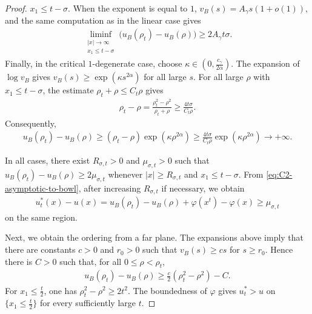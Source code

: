 \documentclass[10pt,a4paper]{amsart}
\begin{document}
\begin{proof}
		$x_1\le t-\sigma$.  When the exponent is equal to $1$,
		$v_B(s)=A_\gamma s(1+o(1))$, and the same computation as in the linear case
		gives
		\begin{align*}
			\liminf\limits_{\substack{|x|\to\infty\\ x_1\le t-\sigma}}
			\bigl(u_B(\rho_t)-u_B(\rho)\bigr)
			\ge
			2A_\gamma t\sigma .
		\end{align*}
		Finally, in the critical $1$-degenerate case, choose
		$\kappa\in\left(0,\frac{c_\gamma}{2\alpha}\right)$.  The expansion of
		$\log v_B$ gives $v_B(s)\ge\exp(\kappa s^{2\alpha})$ for all large $s$.
		For all large $\rho$ with $x_1\le t-\sigma$, the estimate
		$\rho_t+\rho\le C_t\rho$ gives
		\begin{align*}
			\rho_t-\rho
			=
			\frac{\rho_t^2-\rho^2}{\rho_t+\rho}
			\ge
			\frac{4t\sigma}{C_t\rho}.
		\end{align*}
		Consequently,
		\begin{align*}
			u_B(\rho_t)-u_B(\rho)
			\ge
			(\rho_t-\rho)\exp(\kappa\rho^{2\alpha})
			\ge
			\frac{4t\sigma}{C_t\rho}\exp(\kappa\rho^{2\alpha})
			\to+\infty .
		\end{align*}
		
		In all cases, there exist $R_{\sigma,t}>0$ and $\mu_{\sigma,t}>0$ such that
		$u_B(\rho_t)-u_B(\rho)\ge2\mu_{\sigma,t}$ whenever
		$|x|\ge R_{\sigma,t}$ and $x_1\le t-\sigma$.  From
		\eqref{eq:C2-asymptotic-to-bowl}, after increasing $R_{\sigma,t}$ if
		necessary, we obtain
		\begin{align*}
			u_t^*(x)-u(x)
			=
			u_B(\rho_t)-u_B(\rho)+\varphi(x^t)-\varphi(x)
			\ge
			\mu_{\sigma,t}
		\end{align*}
		on the same region.
		
		\medskip
		
		Next, we obtain the ordering from a far plane.  The expansions above imply that
		there are constants $c>0$ and $r_0>0$ such that $v_B(s)\ge cs$ for
		$s\ge r_0$.  Hence there is $C>0$ such that, for all $0\le\rho<\rho_t$,
		\begin{align*}
			u_B(\rho_t)-u_B(\rho)
			\ge
			\frac{c}{2}(\rho_t^2-\rho^2)-C .
		\end{align*}
		For $x_1\le\frac{t}{2}$, one has $\rho_t^2-\rho^2\ge2t^2$.  The boundedness
		of $\varphi$ gives $u_t^*>u$ on $\{x_1\le\frac{t}{2}\}$ for every
		sufficiently large $t$.
		
		\medskip
		

\end{proof}
\end{document}
